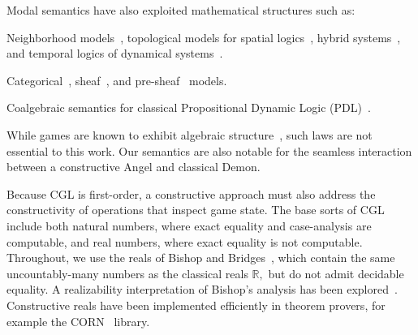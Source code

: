\documentclass[12pt]{cmuthesis}
\theoremstyle{definition}
\theoremstyle{remark}
\newcommand{\CGL}{\textsf{CGL}\xspace}
\begin{document}
Modal semantics have also exploited mathematical structures such as:
\begin{inparaenum}[i)]
\item Neighborhood models~\cite{DBLP:conf/lori/BenthemBE17}, topological models for spatial logics~\cite{DBLP:reference/spatial/BenthemB07}, hybrid systems~\cite{DBLP:conf/lfcs/ArtemovDN97}, and temporal logics of dynamical systems~\cite{DBLP:journals/lmcs/Fernandez-Duque18}.
\item Categorical~\cite{DBLP:conf/csl/AlechinaMPR01}, sheaf~\cite{Hilken_afirst}, and pre-sheaf~\cite{DBLP:journals/aml/Ghilardi89} models.
\item Coalgebraic semantics for classical Propositional Dynamic Logic (PDL)~\cite{DBLP:journals/corr/abs-1109-3685}.
\end{inparaenum}
While games are known to exhibit algebraic structure~\cite{DBLP:journals/sLogica/Goranko03}, such laws are not essential to this work.
Our semantics are also notable for the seamless interaction between a constructive Angel and classical Demon.

Because \CGL is first-order, a constructive approach must also address the constructivity of operations that inspect game state.
The base sorts of \CGL include both natural numbers, where exact equality and case-analysis are computable, and real numbers, where exact equality is not computable.
Throughout, we use the reals of Bishop and Bridges~\cite{bishop1967foundations,bridges2007techniques}, which contain the same uncountably-many numbers as the classical reals $\mathbb{R},$ but do not admit decidable equality.
A realizability interpretation of Bishop's analysis has been explored~\cite{DBLP:journals/mst/Schwichtenberg08}.
Constructive reals have been implemented efficiently in theorem provers, for example the CORN~\cite{Krebbers+Spitters:lmcs:corn:2011} library.
\end{document}
